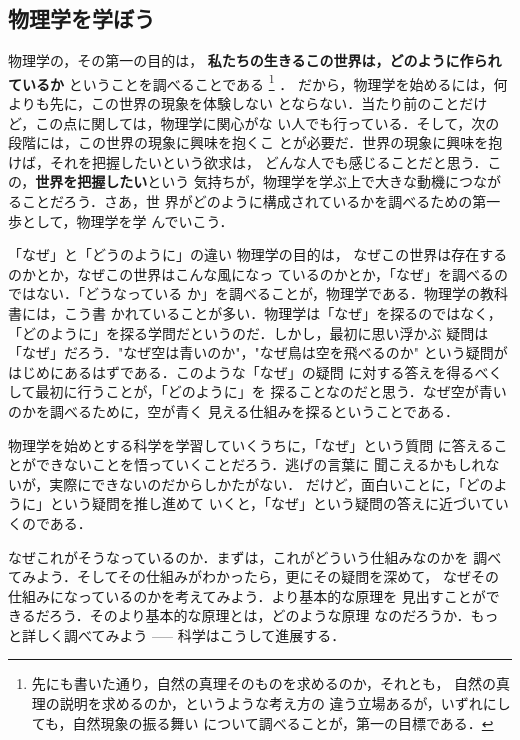         \subsection{物理学を学ぼう}
            物理学の，その第一の目的は，
            \textbf{私たちの生きるこの世界は，どのように作られているか}
            ということを調べることである
                \footnote{
                    先にも書いた通り，自然の真理そのものを求めるのか，それとも，
                    自然の真理の説明を求めるのか，というような考え方の
                    違う立場あるが，いずれにしても，自然現象の振る舞い
                    について調べることが，第一の目標である．
                }
            ．
            だから，物理学を始めるには，何よりも先に，この世界の現象を体験しない
            とならない．当たり前のことだけど，この点に関しては，物理学に関心がな
            い人でも行っている．そして，次の段階には，この世界の現象に興味を抱くこ
            とが必要だ．世界の現象に興味を抱けば，それを把握したいという欲求は，
            どんな人でも感じることだと思う．この，\textbf{世界を把握したい}という
            気持ちが，物理学を学ぶ上で大きな動機につながることだろう．さあ，世
            界がどのように構成されているかを調べるための第一歩として，物理学を学
            んでいこう．

        \begin{memo}{「なぜ」と「どうのように」の違い}
            物理学の目的は，
            なぜこの世界は存在するのかとか，なぜこの世界はこんな風になっ
            ているのかとか，「なぜ」を調べるのではない．「どうなっている
            か」を調べることが，物理学である．物理学の教科書には，こう書
            かれていることが多い．物理学は「なぜ」を探るのではなく，
            「どのように」を探る学問だというのだ．しかし，最初に思い浮かぶ
            疑問は「なぜ」だろう．"なぜ空は青いのか"，"なぜ鳥は空を飛べるのか"
            という疑問がはじめにあるはずである．このような「なぜ」の疑問
            に対する答えを得るべくして最初に行うことが，「どのように」を
            探ることなのだと思う．なぜ空が青いのかを調べるために，空が青く
            見える仕組みを探るということである．

            物理学を始めとする科学を学習していくうちに，「なぜ」という質問
            に答えることができないことを悟っていくことだろう．逃げの言葉に
            聞こえるかもしれないが，実際にできないのだからしかたがない．
            だけど，面白いことに，「どのように」という疑問を推し進めて
            いくと，「なぜ」という疑問の答えに近づいていくのである．

            なぜこれがそうなっているのか．まずは，これがどういう仕組みなのかを
            調べてみよう．そしてその仕組みがわかったら，更にその疑問を深めて，
            なぜその仕組みになっているのかを考えてみよう．より基本的な原理を
            見出すことができるだろう．そのより基本的な原理とは，どのような原理
            なのだろうか．もっと詳しく調べてみよう ----- 科学はこうして進展する．
        \end{memo}
